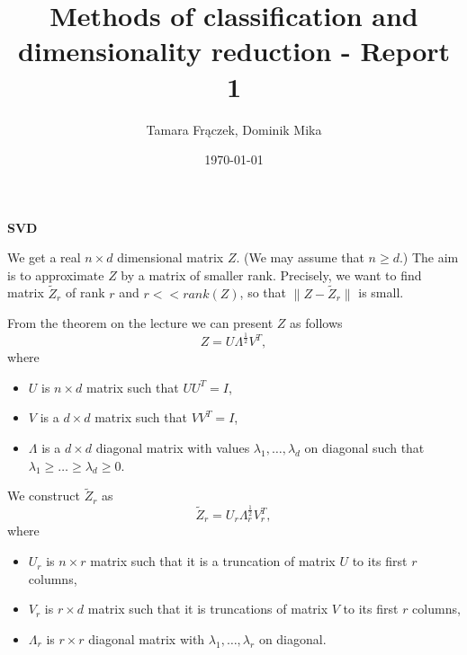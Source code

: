 \documentclass[11pt]{article}
\author{Tamara Frączek, Dominik Mika}
\title{Methods of classification and dimensionality reduction - Report 1}
\date{\today}
\begin{document}
\maketitle

\textbf{SVD}

We get a real $n \times d$ dimensional matrix $Z$.
(We may assume that $n \ge d$.)
The aim is to approximate $Z$ by a matrix of smaller rank.
Precisely, we want to find matrix $\tilde{Z}_r$ of rank $r$ and $r << rank(Z)$, so that $\|Z - \tilde{Z}_r\|$ is small.

From the theorem on the lecture we can present $Z$ as follows
\[Z = U \Lambda^{\frac{1}{2}} V^T,\]
where
\begin{itemize}
    \item $U$ is $n \times d$ matrix such that $U U^T = I$,
    \item $V$ is a $d \times d$ matrix such that $V V^T = I$,
    \item $\Lambda$ is a $d \times d$ diagonal matrix with values $\lambda_1, \dots, \lambda_d$ on diagonal such that $\lambda_1 \ge \dots \ge \lambda_d \ge 0$.
\end{itemize}


We construct $\tilde{Z}_r$ as
\[\tilde{Z}_r = U_r \Lambda_r^{\frac{1}{2}}V_r^T,\]
where
\begin{itemize}
    \item $U_r$ is $n \times r$ matrix such that it is a truncation of matrix $U$ to its first $r$ columns,
    \item $V_r$ is $r \times d$ matrix such that it is truncations of matrix $V$ to its first $r$ columns,
    \item $\Lambda_r$ is $r \times r$ diagonal matrix with $\lambda_1, \dots, \lambda_r$ on diagonal.
\end{itemize}
\end{document}
